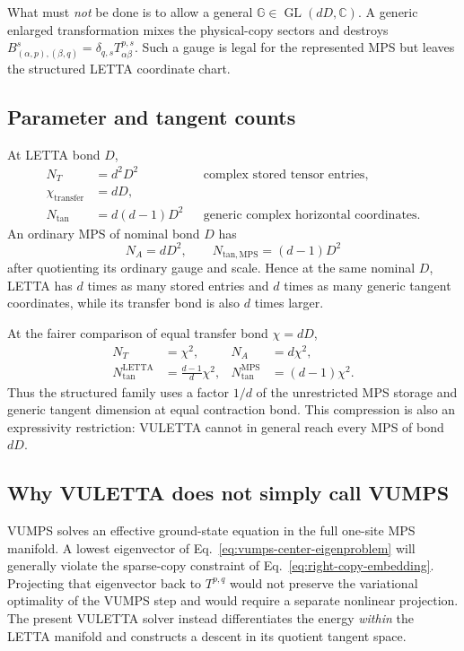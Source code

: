 \documentclass[11pt]{article}
\newcommand{\CC}{\mathbb{C}}
\begin{document}
What must \emph{not} be done is to allow a general
$\mathbb G\in\operatorname{GL}(dD,\CC)$.  A generic enlarged transformation
mixes the physical-copy sectors and destroys
$B^s_{(\alpha,p),(\beta,q)}=\delta_{q,s}T^{p,s}_{\alpha\beta}$.  Such a gauge
is legal for the represented MPS but leaves the structured LETTA coordinate
chart.

\subsection{Parameter and tangent counts}

At LETTA bond $D$,
\begin{align}
  N_T&=d^2D^2
  &&\text{complex stored tensor entries},
  \label{eq:letta-storage-count-comparison}\\
  \chi_{\mathrm{transfer}}&=dD,
  \label{eq:letta-transfer-bond}\\
  N_{\mathrm{tan}}&=d(d-1)D^2
  &&\text{generic complex horizontal coordinates}.
  \label{eq:letta-tangent-count}
\end{align}
An ordinary MPS of nominal bond $D$ has
\begin{equation}
  N_A=dD^2,
  \qquad
  N_{\mathrm{tan,MPS}}=(d-1)D^2
  \label{eq:mps-counts-same-D}
\end{equation}
after quotienting its ordinary gauge and scale.  Hence at the same nominal
$D$, LETTA has $d$ times as many stored entries and $d$ times as many generic
tangent coordinates, while its transfer bond is also $d$ times larger.

At the fairer comparison of equal transfer bond $\chi=dD$,
\begin{align}
  N_T&=\chi^2,
  &
  N_A&=d\chi^2,
  \label{eq:equal-transfer-storage}\\
  N_{\mathrm{tan}}^{\mathrm{LETTA}}
    &=\frac{d-1}{d}\chi^2,
  &
  N_{\mathrm{tan}}^{\mathrm{MPS}}
    &=(d-1)\chi^2.
  \label{eq:equal-transfer-tangent}
\end{align}
Thus the structured family uses a factor $1/d$ of the unrestricted MPS
storage and generic tangent dimension at equal contraction bond.  This
compression is also an expressivity restriction: VULETTA cannot in general
reach every MPS of bond $dD$.

\subsection{Why VULETTA does not simply call VUMPS}

VUMPS solves an effective ground-state equation in the full one-site MPS
manifold.  A lowest eigenvector of Eq.~\eqref{eq:vumps-center-eigenproblem}
will generally violate the sparse-copy constraint of
Eq.~\eqref{eq:right-copy-embedding}.  Projecting that eigenvector back to
$T^{p,q}$ would not preserve the variational optimality of the VUMPS step and
would require a separate nonlinear projection.  The present VULETTA solver
instead differentiates the energy \emph{within} the LETTA manifold and
constructs a descent in its quotient tangent space.
\end{document}
